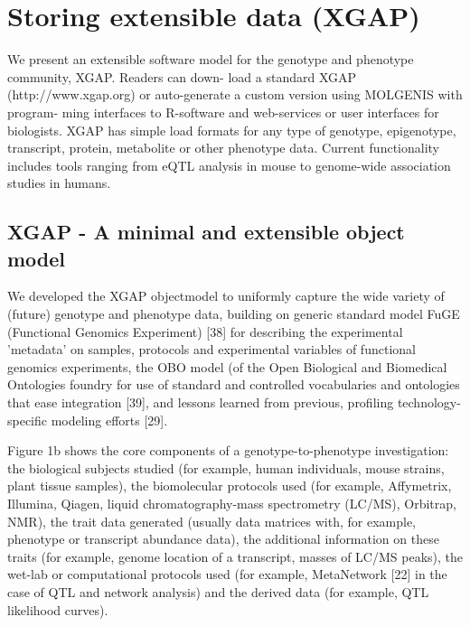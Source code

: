 \documentclass[8pt, twoside, a5paper]{report}
\begin{document}
\section{Storing extensible data (XGAP)}
We present an extensible software model for the genotype and phenotype community, XGAP. Readers can down-
load a standard XGAP (http://www.xgap.org) or auto-generate a custom version using MOLGENIS with program-
ming interfaces to R-software and web-services or user interfaces for biologists. XGAP has simple load formats for
any type of genotype, epigenotype, transcript, protein, metabolite or other phenotype data. Current functionality
includes tools ranging from eQTL analysis in mouse to genome-wide association studies in humans.

\subsection{XGAP - A minimal and extensible object model}

We developed the XGAP objectmodel to uniformly capture the wide variety of (future) genotype and phenotype data, building 
on generic standard model FuGE (Functional Genomics Experiment) [38] for describing the experimental 'metadata' on samples, protocols and
experimental variables of functional genomics experiments, the OBO model (of the Open Biological and Biomedical Ontologies foundry for use of standard and
controlled vocabularies and ontologies that ease integration [39], and lessons learned from previous, profiling technology-specific modeling efforts [29].

Figure 1b shows the core components of a genotype-to-phenotype investigation: the biological subjects studied (for example, human individuals, mouse strains,
plant tissue samples), the biomolecular protocols used (for example, Affymetrix, Illumina, Qiagen, liquid chromatography-mass spectrometry (LC/MS), Orbitrap,
NMR), the trait data generated (usually data matrices with, for example, phenotype or transcript abundance data), the additional information on these traits (for
example, genome location of a transcript, masses of LC/MS peaks), the wet-lab or computational protocols used (for example, MetaNetwork [22] in the case of QTL and
network analysis) and the derived data (for example, QTL likelihood curves).
\end{document}
